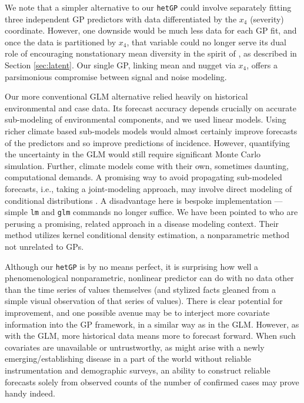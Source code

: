 \documentclass[12pt]{article}
\begin{document}
We note that a simpler alternative to our {\tt hetGP} could involve separately
fitting three independent GP predictors with data differentiated by the $x_4$
(severity) coordinate.  However, one downside would be much less data for each
GP fit, and once the data is partitioned by $x_4$, that variable could no
longer serve its dual role of encouraging nonstationary mean diversity in the
spirit of \citet{bornn:shaddick:zidek:2012}, as described in Section
\ref{sec:latent}. Our single GP, linking mean and nugget via $x_4$, offers a
parsimonious compromise between signal and noise modeling.

Our more conventional GLM alternative relied heavily on historical
environmental and case data. Its forecast accuracy depends crucially on
accurate sub-modeling of environmental components, and we used linear models.
Using richer climate based sub-models models would almost certainly improve
forecasts of the predictors and so improve predictions of incidence. However,
quantifying the uncertainty in the GLM would still require significant Monte
Carlo simulation. Further, climate models come with their own, sometimes
daunting, computational demands. A promising way to avoid propagating
sub-modeled forecasts, i.e., taking a joint-modeling approach, may involve
direct modeling of conditional distributions
\cite[e.g.,][]{gneiting:etal:2006}.   A disadvantage here is bespoke
implementation --- simple {\tt lm} and {\tt glm} commands no longer suffice.  We
have been pointed to \citet{ray:etal:2017} who are perusing a promising,
related approach in a disease modeling context.  Their method utilizes kernel
conditional density estimation, a nonparametric method not unrelated to GPs.

Although our {\tt hetGP} is by no means perfect, it is surprising how well a
phenomenological nonparametric, nonlinear predictor can do with no data other
than the time series of values themselves (and stylized facts gleaned from a
simple visual observation of that series of values).  There is clear potential
for improvement, and one possible avenue may be to interject more covariate
information into the GP framework, in a similar way as in the GLM.  However,
as with the GLM, more historical data means more to forecast forward. When
such covariates are unavailable or untrustworthy, as might arise with a newly
emerging/establishing disease in a part of the world without reliable
instrumentation and demographic surveys, an ability to construct reliable
forecasts solely from observed counts of the number of confirmed cases may
prove handy indeed.
\end{document}
